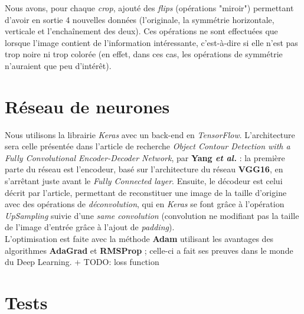 \documentclass{report}
\begin{document}
Nous avons, pour chaque \textit{crop}, ajouté des \textit{flips} (opérations "miroir")
permettant d'avoir en sortie 4 nouvelles données (l'originale, la symmétrie horizontale,
verticale et l'enchaînement des deux). Ces opérations ne sont effectuées que lorsque
l'image contient de l'information intéressante, c'est-à-dire si elle n'est pas trop
noire ni trop colorée (en effet, dans ces cas, les opérations de symmétrie n'auraient
que peu d'intérêt).


\chapter{Réseau de neurones}

Nous utilisons la librairie \textit{Keras} avec un back-end en \textit{TensorFlow}.
L'architecture sera celle présentée dans l'article de recherche \textit{Object Contour
Detection with a Fully Convolutional Encoder-Decoder Network}, par \textbf{Yang
\textit{et al.}} : la première parte du réseau est l'encodeur, basé sur l'architecture
du réseau \textbf{VGG16}, en s'arrêtant juste avant le \textit{Fully Connected layer}.
Ensuite, le décodeur est celui décrit par l'article, permettant de reconstituer
une image de la taille d'origine avec des opérations de \textit{déconvolution},
qui en \textit{Keras} se font grâce à l'opération \textit{UpSampling} suivie d'une
\textit{same convolution} (convolution ne modifiant pas la taille de l'image d'entrée
grâce à l'ajout de \textit{padding}). \\
L'optimisation est faite avec la méthode \textbf{Adam} utilisant les avantages des
algorithmes \textbf{AdaGrad} et \textbf{RMSProp}  ; celle-ci a fait ses preuves
dans le monde du Deep Learning.
+ TODO: loss function

\chapter{Tests}
\end{document}
